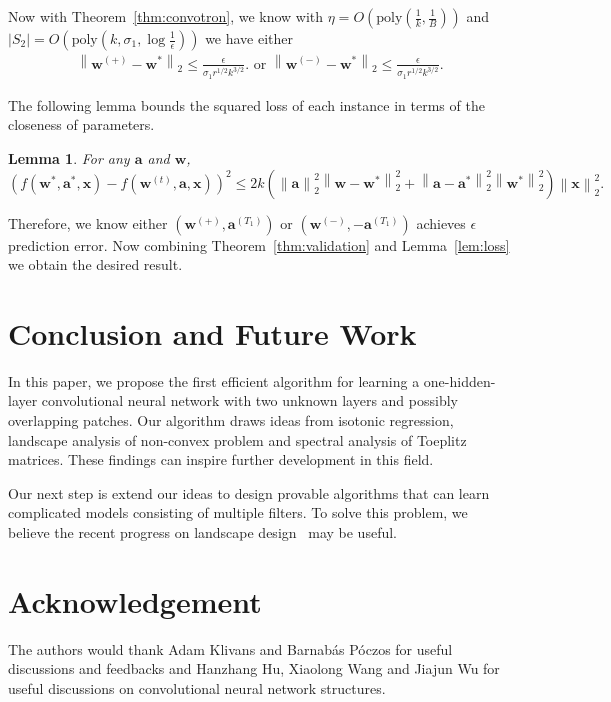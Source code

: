 \documentclass[11pt]{article}
\newcommand{\poly}{\mathrm{poly}}
\newcommand{\vect}[1]{\mathbf{#1}}
\newcommand{\norm}[1]{\left\|#1\right\|}
\newcommand{\abs}[1]{\left|#1\right|}
\newtheorem{lem}{Lemma}[section]
\begin{document}
Now with Theorem~\ref{thm:convotron}, we know with $\eta = O\left(\poly\left(\frac{1}{k},\frac{1}{B}\right)\right)$ and $\abs{S_2} = O\left(\poly\left(k,\sigma_1,\log\frac{1}{\epsilon}\right)\right)$ we have either \begin{align*}
\norm{\vect{w}^{\left(+\right)} - \vect{w}^*}_2 \le \frac{\epsilon}{\sigma_1 r^{1/2}k^{3/2}}. \text{ or }\norm{\vect{w}^{\left(-\right)}-\vect{w}^*}_2 \le \frac{\epsilon}{\sigma_1 r^{1/2}k^{3/2}}.
\end{align*}

The following lemma bounds the squared loss of each instance in terms of the closeness of parameters.
\begin{lem}\label{lem:bound}
For any $\vect{a}$ and $\vect{w}$,
\[
\left(f\left(\vect{w}^*, \vect{a}^*, \vect{x}\right) - f\left(\vect{w}^{\left(t\right)}, \vect{a}, \vect{x}\right)\right)^2 \leq 2k \left(\norm{\vect{a}}_2^2\norm{\vect{w} - \vect{w}^*}_2^2 + \norm{\vect{a} - \vect{a}^*}_2^2\norm{\vect{w}^*}_2^2\right)\norm{\vect{x}}_2^2.
\]
\end{lem}
Therefore, we know either $\left(\vect{w}^{(+)},\vect{a}^{(T_1)}\right)$ or $\left(\vect{w}^{(-)},-\vect{a}^{(T_1)}\right)$ achieves $\epsilon$ prediction error.
Now combining Theorem~\ref{thm:validation} and Lemma~\ref{lem:loss} we obtain the desired result.




\section{Conclusion and Future Work}
\label{sec:con}
In this paper, we propose the first efficient algorithm for learning a one-hidden-layer convolutional neural network with two unknown layers and possibly overlapping patches.
Our algorithm draws ideas from isotonic regression, landscape analysis of non-convex problem and spectral analysis of Toeplitz matrices.
These findings can inspire further development in this field.

Our next step is extend our ideas to design provable algorithms that can learn complicated models consisting of multiple filters.
To solve this problem, we believe the recent progress on landscape design~\citep{ge2017learning} may be useful.



\section{Acknowledgement}
\label{sec:ack}
The authors would thank Adam Klivans and Barnab\'{a}s P\'{o}czos for useful discussions and feedbacks and Hanzhang Hu, Xiaolong Wang and Jiajun Wu for useful discussions on convolutional neural network structures.
\end{document}
